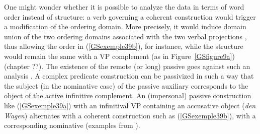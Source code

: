 \documentclass[output=paper
                ,modfonts
                ,nonflat
	        ,collection
	        ,collectionchapter
	        ,collectiontoclongg
 	        ,biblatex
                ,babelshorthands
                ,newtxmath
                ,draftmode
                ,colorlinks, citecolor=brown
]{./langsci/langscibook}
\begin{document}
{One might wonder whether it is possible to analyze the data in terms of word order instead of structure: a verb governing a coherent construction would trigger a modification of the ordering domain. More precisely, it would induce domain union of the two ordering domains associated with the two verbal projections \citep{reape1994domain}, thus allowing the order in (\ref{GSexemple39b}), for instance, while the structure would remain the same with a VP complement (as in Figure~\ref{GSfigure9a}) (chapter ??). The existence of the remote (or long) passive goes against such an analysis \citep{HN94a-ohne-crossref, Kathol98b, Mueller2002b}. A complex predicate construction can be passivized in such a way that the subject (in the nominative case) of the passive auxiliary corresponds to the object of the active infinitive complement. An (impersonal) passive construction like (\ref{GSexemple39a}) with an infinitival VP containing an accusative object (\textit{den Wagen}) alternates with a coherent construction such as (\ref{GSexemple39b}), with a corresponding nominative (examples from \citealt{Mueller2002b}). 

\begin{exe}
	\ex \label{GSexemple39} 
	\begin{xlist}
        \label{GSexemple39a}

        \label{GSexemple39b}

		\label{GSexemple39c}	
		
		\label{GSexemple39d}
		
		\end{xlist}
\end{exe}

}
\end{document}
